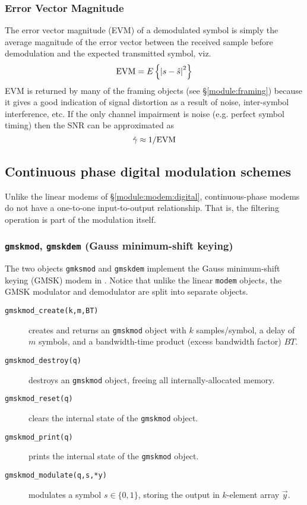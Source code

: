 \subsubsection{Error Vector Magnitude}
\label{module:modem:digital:evm}
The error vector magnitude (EVM) of a demodulated symbol is simply the
average magnitude of the error vector between the received sample
before demodulation and the expected transmitted symbol, viz.
%
\begin{equation}
\label{eqn:modem:evm}
    \textup{EVM} = E\left\{ \left| s - \hat{s} \right|^2 \right\}
\end{equation}
%
EVM is returned by many of the framing objects
(see \S\ref{module:framing})
because it gives a good indication of signal distortion as a result of
noise, inter-symbol interference, etc.
If the only channel impairment is noise (e.g. perfect symbol timing)
then the SNR can be approximated as
\[
    \hat{\gamma} \approx 1 / \textup{EVM}
\]


%
%

\subsection{Continuous phase digital modulation schemes}
\label{module:modem:cpm}

Unlike the linear modems of \S\ref{module:modem:digital},
continuous-phase modems do not have a one-to-one input-to-output
relationship.
That is, the filtering operation is part of the modulation itself.


\subsubsection{{\tt gmskmod}, {\tt gmskdem} (Gauss minimum-shift keying)}
\label{module:modem:cpm:gmskmodem}

The two objects {\tt gmksmod} and {\tt gmskdem} implement the Gauss
minimum-shift keying (GMSK) modem in \liquid.
Notice that unlike the linear {\tt modem} objects, the GMSK
modulator and demodulator are split into separate objects.

%
\begin{description}
\item[{\tt gmskmod\_create(k,m,BT)}]
    creates and returns an {\tt gmskmod} object with
    $k$ samples/symbol,
    a delay of $m$ symbols,
    and a bandwidth-time product (excess bandwidth factor) $BT$.
\item[{\tt gmskmod\_destroy(q)}]
    destroys an {\tt gmskmod} object, freeing all internally-allocated
    memory.
\item[{\tt gmskmod\_reset(q)}]
    clears the internal state of the {\tt gmskmod} object.
\item[{\tt gmskmod\_print(q)}]
    prints the internal state of the {\tt gmskmod} object.
\item[{\tt gmskmod\_modulate(q,s,*y)}]
    modulates a symbol $s \in \{0,1\}$,
    storing the output in $k$-element array $\vec{y}$.
\end{description}

